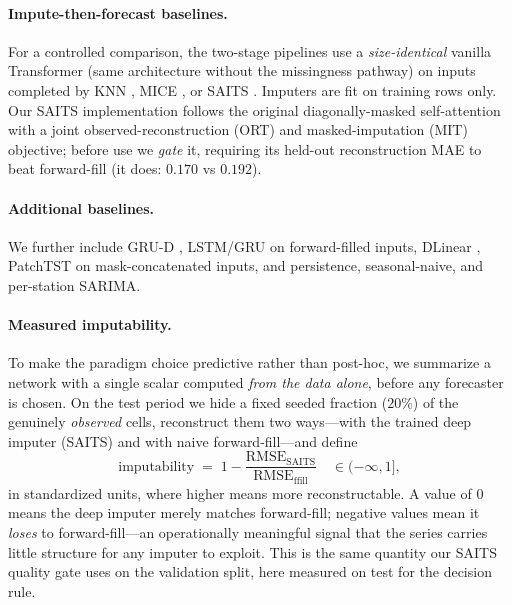 \documentclass[review,3p,times]{elsarticle}
\begin{document}
\paragraph{Impute-then-forecast baselines.}
For a controlled comparison, the two-stage pipelines use a \emph{size-identical}
vanilla Transformer (same architecture without the missingness pathway) on
inputs completed by KNN \citep{troyanskaya2001missing}, MICE
\citep{vanbuuren2011mice}, or SAITS \citep{du2023saits}. Imputers are fit on
training rows only. Our SAITS implementation follows the original
diagonally-masked self-attention with a joint observed-reconstruction (ORT) and
masked-imputation (MIT) objective; before use we \emph{gate} it, requiring its
held-out reconstruction MAE to beat forward-fill (it does: $0.170$ vs $0.192$).

\paragraph{Additional baselines.}
We further include GRU-D \citep{che2018grud}, LSTM/GRU on forward-filled inputs,
DLinear \citep{zeng2023dlinear}, PatchTST \citep{nie2023patchtst} on
mask-concatenated inputs, and persistence, seasonal-naive, and per-station SARIMA.

\paragraph{Measured imputability.}
To make the paradigm choice predictive rather than post-hoc, we summarize a
network with a single scalar computed \emph{from the data alone}, before any
forecaster is chosen. On the test period we hide a fixed seeded fraction
($20\%$) of the genuinely \emph{observed} cells, reconstruct them two ways---with
the trained deep imputer (SAITS) and with naive forward-fill---and define
\begin{equation}
\mathrm{imputability} \;=\; 1 - \frac{\mathrm{RMSE_{SAITS}}}{\mathrm{RMSE_{ffill}}}
\quad\in(-\infty,1],
\label{eq:imputability}
\end{equation}
in standardized units, where higher means more reconstructable. A value of $0$
means the deep imputer merely matches forward-fill; negative values mean it
\emph{loses} to forward-fill---an operationally meaningful signal that the
series carries little structure for any imputer to exploit. This is the same
quantity our SAITS quality gate uses on the validation split, here measured on
test for the decision rule.
\end{document}
